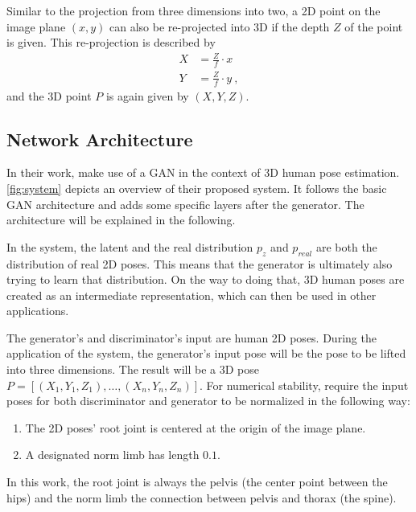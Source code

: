 Similar to the projection from three dimensions into two, a 2D point on the image plane $(x, y)$ can also be re-projected into 3D if the depth $Z$ of the point is given.
This re-projection is described by
\begin{align}
	\label{eq:perspective-re-projection}
	X &= \frac{Z}{f} \cdot x \\
	Y &= \frac{Z}{f} \cdot y \ ,
\end{align}
and the 3D point $P$ is again given by $(X, Y, Z)$.

\subsection{Network Architecture}
\label{sec:network-architecture}



In their work, \citet{drover18} make use of a GAN in the context of 3D human pose estimation.
\autoref{fig:system} depicts an overview of their proposed system.
It follows the basic GAN architecture and adds some specific layers after the generator.
The architecture will be explained in the following.

In the system, the latent and the real distribution $p_z$ and $p_{real}$ are both the distribution of real 2D poses.
This means that the generator is ultimately also trying to learn that distribution.
On the way to doing that, 3D human poses are created as an intermediate representation, which can then be used in other applications.

The generator's and discriminator's input are human 2D poses.
During the application of the system, the generator's input pose will be the pose to be lifted into three dimensions.
The result will be a 3D pose $P = [(X_1, Y_1, Z_1), \dotsc, (X_n, Y_n, Z_n)]$.
For numerical stability, \citet{drover18} require the input poses for both discriminator and generator to be normalized in the following way:
\begin{enumerate}[label=(\Alph*)]
	\item The 2D poses' root joint is centered at the origin of the image plane.
	\item A designated norm limb has length $0.1$.
\end{enumerate}
In this work, the root joint is always the pelvis (the center point between the hips) and the norm limb the connection between pelvis and thorax (the spine).


